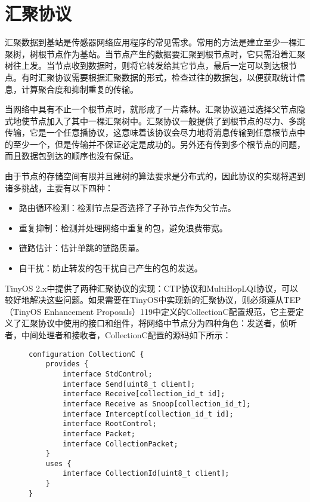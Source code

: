 \section{汇聚协议}
	汇聚数据到基站是传感器网络应用程序的常见需求。常用的方法是建立至少一棵汇聚树，树根节点作为基站。当节点产生的数据要汇聚到根节点时，它只需沿着汇聚树往上发。当节点收到数据时，则将它转发给其它节点，最后一定可以到达根节点。有时汇聚协议需要根据汇聚数据的形式，检查过往的数据包，以便获取统计信息，计算聚合度和抑制重复的传输。

	当网络中具有不止一个根节点时，就形成了一片森林。汇聚协议通过选择父节点隐式地使节点加入了其中一棵汇聚树中。汇聚协议一般提供了到根节点的尽力、多跳传输，它是一个{\kai 任意播}协议，这意味着该协议会尽力地将消息传输到任意根节点中的至少一个，但是传输并不保证必定是成功的。另外还有传到多个根节点的问题，而且数据包到达的顺序也没有保证。

	由于节点的存储空间有限并且建树的算法要求是分布式的，因此协议的实现将遇到诸多挑战，主要有以下四种：
\vspace{-10pt}
\begin{itemize}
	\item 路由循环检测：检测节点是否选择了子孙节点作为父节点。
	\item 重复抑制：检测并处理网络中重复的包，避免浪费带宽。
	\item 链路估计：估计单跳的链路质量。
	\item 自干扰：防止转发的包干扰自己产生的包的发送。
\end{itemize}
\vspace{-10pt}
	TinyOS 2.x中提供了两种汇聚协议的实现：CTP协议和MultiHopLQI协议，可以较好地解决这些问题。如果需要在TinyOS中实现新的汇聚协议，则必须遵从TEP（TinyOS Enhancement Proposals）119中定义的CollectionC配置规范，它主要定义了汇聚协议中使用的接口和组件，将网络中节点分为四种角色：发送者，侦听者，中间处理者和接收者，CollectionC配置的源码如下所示：

\begin{figure}[ht]
\centering
\begin{lstlisting}
configuration CollectionC {
	provides {
		interface StdControl;
		interface Send[uint8_t client];
		interface Receive[collection_id_t id];
		interface Receive as Snoop[collection_id_t];
		interface Intercept[collection_id_t id];
		interface RootControl;
		interface Packet;
		interface CollectionPacket;
	}
	uses {
		interface CollectionId[uint8_t client];
	}
}
\end{lstlisting}
\end{figure}

